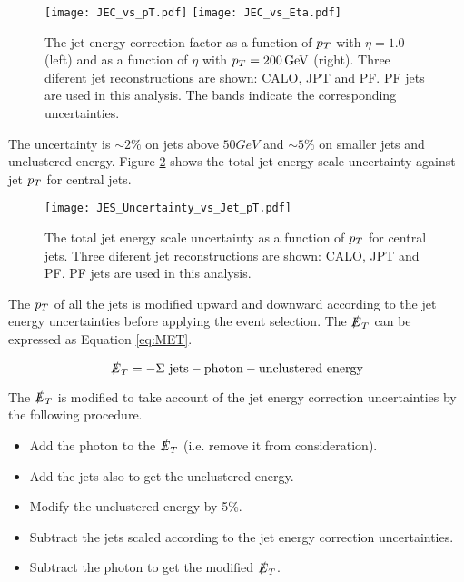 \begin{figure}
\texttt{[image: JEC\_vs\_pT.pdf]}
\texttt{[image: JEC\_vs\_Eta.pdf]}
\caption{The jet energy correction factor as a function of $p_{T}$ with $\eta =
1.0$ (left) and as a function of $\eta$ with $p_{T} = 200 \, \mathrm{GeV}$ (right). 
Three diferent jet reconstructions are shown: CALO, JPT and PF. PF jets are used 
in this analysis. The bands indicate the corresponding uncertainties.}
\label{fig:JEC_vs_pT_And_Eta}
\end{figure}

The uncertainty is $\sim 2 \unit{\%}$ on jets above $50 \unit{GeV}$ and $\sim 5 
\unit{\%}$ on smaller jets and unclustered energy. Figure 
\ref{fig:JES_Uncertainty_vs_Jet_pT} shows the total jet energy scale uncertainty 
against jet $p_{T}$ for central jets. \\

\begin{figure}
\begin{center}
\texttt{[image: JES\_Uncertainty\_vs\_Jet\_pT.pdf]}
\end{center}
\caption{The total jet energy scale uncertainty as a function of $p_{T}$ for
central jets. Three diferent jet reconstructions are shown: CALO, JPT and PF. 
PF jets are used in this analysis.}
\label{fig:JES_Uncertainty_vs_Jet_pT}
\end{figure}

The $p_{T}$ of all the jets is modified upward and downward according to the jet 
energy uncertainties before applying the event selection. The $\slashed{E}_{T}$ can be 
expressed as Equation \ref{eq:MET}.

\begin{equation}
\slashed{E}_{T} = -\Sigma \mbox{ jets} - \mbox{photon} - \mbox{unclustered energy}
\label{eq:MET}
\end{equation}

The $\slashed{E}_{T}$ is modified to take account of the jet energy correction
uncertainties by the following procedure. 

\begin{itemize}
\item Add the photon to the $\slashed{E}_{T}$ (i.e. remove it from consideration).
\item Add the jets also to get the unclustered energy.
\item Modify the unclustered energy by 5\%.
\item Subtract the jets scaled according to the jet energy correction 
uncertainties.
\item Subtract the photon to get the modified $\slashed{E}_{T}$.
\end{itemize}

